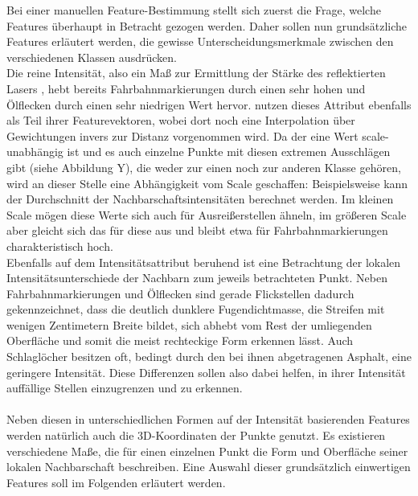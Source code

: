 Bei einer manuellen Feature-Bestimmung stellt sich zuerst die Frage, welche Features überhaupt in Betracht gezogen werden. Daher sollen nun grundsätzliche Features erläutert werden, die gewisse Unterscheidungsmerkmale zwischen den verschiedenen Klassen ausdrücken. \\
Die reine Intensität, also ein Maß zur Ermittlung der Stärke des reflektierten Lasers , hebt bereits Fahrbahnmarkierungen durch einen sehr hohen und Ölflecken durch einen sehr niedrigen Wert hervor. \cite{Zhiqiang.etal-2019} nutzen dieses Attribut ebenfalls als Teil ihrer Featurevektoren, wobei dort noch eine Interpolation über Gewichtungen invers zur Distanz vorgenommen wird. Da der eine Wert scale-unabhängig ist und es auch einzelne Punkte mit diesen extremen Ausschlägen gibt (siehe Abbildung Y), die weder zur einen noch zur anderen Klasse gehören, wird an dieser Stelle eine Abhängigkeit vom Scale geschaffen: Beispielsweise kann der Durchschnitt der Nachbarschaftsintensitäten berechnet werden. Im kleinen Scale mögen diese Werte sich auch für Ausreißerstellen ähneln, im größeren Scale aber gleicht sich das für diese aus und bleibt etwa für Fahrbahnmarkierungen charakteristisch hoch. \\
Ebenfalls auf dem Intensitätsattribut beruhend ist eine Betrachtung der lokalen Intensitätsunterschiede der Nachbarn zum jeweils betrachteten Punkt. Neben Fahrbahnmarkierungen und Ölflecken sind gerade Flickstellen dadurch gekennzeichnet, dass die deutlich dunklere Fugendichtmasse, die Streifen mit wenigen Zentimetern Breite bildet, sich abhebt vom Rest der umliegenden Oberfläche und somit die meist rechteckige Form erkennen lässt. Auch Schlaglöcher besitzen oft, bedingt durch den bei ihnen abgetragenen Asphalt, eine geringere Intensität. Diese Differenzen sollen also dabei helfen, in ihrer Intensität auffällige Stellen einzugrenzen und zu erkennen. \\\\
Neben diesen in unterschiedlichen Formen auf der Intensität basierenden Features werden natürlich auch die 3D-Koordinaten der Punkte genutzt. Es existieren verschiedene Maße, die für einen einzelnen Punkt die Form und Oberfläche seiner lokalen Nachbarschaft beschreiben. Eine Auswahl dieser grundsätzlich einwertigen Features soll im Folgenden erläutert werden. \\
